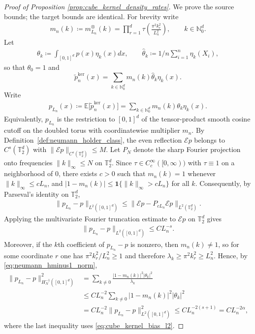 \documentclass[11pt,reqno]{amsart}
\theoremstyle{definition}
\renewcommand{\hat}{\widehat}
\renewcommand{\tilde}{\widetilde}
\newcommand{\Ep}{\mathbb{E}}
\begin{document}
\begin{proof}[Proof of Proposition \ref{prop:cube_kernel_density_rates}]
We prove the source bounds; the target bounds are identical. For brevity write
\begin{align*}
    m_n(k)
    \coloneqq
    m_{L_n}^{\otimes}(k)
    =
    \prod_{r=1}^d
    \tau\left(\frac{\pi^2 k_r^2}{L_n^2}\right),
    \qquad k\in\mathbb N_0^d.
\end{align*}
Let
\begin{align*}
    \theta_k \coloneqq \int_{[0,1]^d} p(x)\eta_k(x) dx,
    \qquad
    \hat\theta_k \coloneqq {1/n}\sum_{i=1}^n \eta_k(X_i),
\end{align*}
so that $\theta_0=1$ and
\begin{equation}\label{eq:tildeker}
    \tilde p_n^{\mathrm{ker}}(x)
    =
    \sum_{k\in\mathbb N_0^d}
    m_n(k)\hat\theta_k\eta_k(x).
\end{equation}
Write
\begin{align*}
    p_{L_n}(x)
    \coloneqq
    \Ep\bigl[\tilde p_n^{\mathrm{ker}}(x)\bigr]
    =
    \sum_{k\in\mathbb N_0^d}
    m_n(k)\theta_k\eta_k(x).
\end{align*}
Equivalently, $p_{L_n}$ is the restriction to $[0,1]^d$ of the tensor-product smooth cosine cutoff on the doubled torus with coordinatewise multiplier $m_n$.
By Definition~\ref{def:neumann_holder_class}, the even reflection $\mathcal Ep$ belongs to $C^s(\mathbb T_2^d)$ with $\|\mathcal Ep\|_{C^s(\mathbb T_2^d)}\le M$.
Let $P_N$ denote the sharp Fourier projection onto frequencies $\|k\|_\infty\le N$ on $\mathbb T_2^d$.
Since $\tau\in C_c^\infty([0,\infty))$ with $\tau\equiv 1$ on a neighborhood of $0$, there exists $c>0$ such that $m_n(k)=1$ whenever $\|k\|_\infty\le cL_n$, and $|1-m_n(k)|\le \mathbf 1\{\|k\|_\infty>cL_n\}$ for all $k$.
Consequently, by Parseval's identity on $\mathbb T_2^d$,
\begin{align*}
    \|p_{L_n}-p\|_{L^2([0,1]^d)}
    \le
    \|\mathcal Ep-P_{cL_n}\mathcal Ep\|_{L^2(\mathbb T_2^d)}.
\end{align*}
Applying the multivariate Fourier truncation estimate \cite[Eq.~(5.8.4)]{canuto2006spectral} to $\mathcal Ep$ on $\mathbb T_2^d$ gives
\begin{align}
\label{eq:cube_kernel_bias_l2}
    \|p_{L_n}-p\|_{L^2([0,1]^d)}
    \le
    C L_n^{-s}.
\end{align}
Moreover, if the $k$th coefficient of $p_{L_n}-p$ is nonzero, then $m_n(k)\neq 1$, so for some coordinate $r$ one has $\pi^2k_r^2/L_n^2\ge 1$ and therefore $\lambda_k\ge \pi^2k_r^2\ge L_n^2$.
Hence, by \eqref{eq:neumann_hminus1_norm},
\begin{align}
\label{eq:cube_kernel_bias_hminus1}
    \|p_{L_n}-p\|_{H^{-1}_N([0,1]^d)}^2
    &=
    \sum_{k\neq 0}
    \frac{|1-m_n(k)|^2|\theta_k|^2}{\lambda_k}
    \\
    &\le
    C L_n^{-2}
    \sum_{k\neq 0}|1-m_n(k)|^2|\theta_k|^2
    \\
    &=
    C L_n^{-2}\|p_{L_n}-p\|_{L^2([0,1]^d)}^2
    \le
    C L_n^{-2(s+1)}
    =
    C L_n^{-2\alpha},
\end{align}
where the last inequality uses \eqref{eq:cube_kernel_bias_l2}.


\end{proof}
\end{document}
